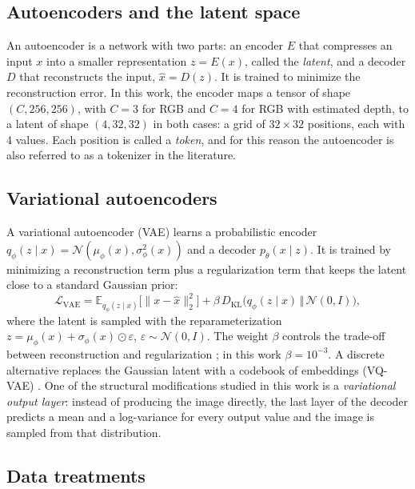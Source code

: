 \subsection{Autoencoders and the latent space}

An autoencoder is a network with two parts: an encoder $E$ that compresses an input $x$ into a smaller representation $z=E(x)$, called the \emph{latent}, and a decoder $D$ that reconstructs the input, $\hat{x}=D(z)$. It is trained to minimize the reconstruction error. In this work, the encoder maps a tensor of shape $(C,256,256)$, with $C=3$ for RGB and $C=4$ for RGB with estimated depth, to a latent of shape $(4,32,32)$ in both cases: a grid of $32\times32$ positions, each with 4 values. Each position is called a \emph{token}, and for this reason the autoencoder is also referred to as a tokenizer in the literature.

\subsection{Variational autoencoders}

A variational autoencoder (VAE) \cite{Kingma2014} learns a probabilistic encoder $q_\phi(z\mid x)=\mathcal{N}(\mu_\phi(x),\sigma_\phi^2(x))$ and a decoder $p_\theta(x\mid z)$. It is trained by minimizing a reconstruction term plus a regularization term that keeps the latent close to a standard Gaussian prior:
\begin{equation}
\mathcal{L}_{\mathrm{VAE}} = \mathbb{E}_{q_\phi(z\mid x)}\big[\lVert x-\hat{x}\rVert_2^2\big] + \beta\, D_{\mathrm{KL}}\big(q_\phi(z\mid x)\,\Vert\,\mathcal{N}(0,I)\big),
\end{equation}
where the latent is sampled with the reparameterization $z=\mu_\phi(x)+\sigma_\phi(x)\odot\varepsilon$, $\varepsilon\sim\mathcal{N}(0,I)$. The weight $\beta$ controls the trade-off between reconstruction and regularization \cite{Higgins2017}; in this work $\beta=10^{-3}$. A discrete alternative replaces the Gaussian latent with a codebook of embeddings (VQ-VAE) \cite{vandenOord2017}. One of the structural modifications studied in this work is a \emph{variational output layer}: instead of producing the image directly, the last layer of the decoder predicts a mean and a log-variance for every output value and the image is sampled from that distribution.

\subsection{Data treatments}

